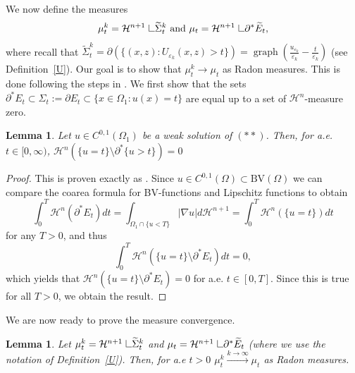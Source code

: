 \documentclass[11pt]{amsart}
\newtheorem{Lemma}[Theorem]{Lemma}
\renewcommand{\epsilon}{\varepsilon}
\DeclareMathOperator{\graph}{graph} \DeclareMathOperator{\closure}{Closure}
\def\e{\epsilon}
\def\H{\mathcal{H}}
\def\wt{\widetilde}
\def\res{\hbox{ {\vrule height .25cm}{\leaders\hrule\hskip.2cm}}\hskip5.0\mu}
\def\BV{\text{BV}}
\begin{document}
 
 
 
 We now  define the measures
 \begin{equation*}\label{measdef}
 \mu_t^k=\H^{n+1}\res \wt \Sigma_t^k \text{  and  }\mu_t=\H^{n+1}\res \partial^*\wt E_t,
 \end{equation*}
 where recall that $\wt \Sigma_t^k=\partial(\{(x, z): U_{\e_k}(x,z)>t\})=\graph \left(\frac{u_{\e_k}}{\e_k}-\frac{t}{\e_k}\right)$ (see Definition~\ref{U}).
 Our goal is to show that $\mu_t^k\to \mu_t$ as Radon measures. This is done following the steps in \cite[Section 5]{S08}. We first show that the sets $\partial^* E_t\subset \Sigma_t:=\partial E_t\subset \{x\in \Omega_1:u(x)=t\}$ are equal up to a set of  $\H^n$-measure zero. 
\begin{Lemma}\label{bdrystar} Let  $u\in C^{0,1}(\Omega_1)$ be a weak solution of $(**)$. Then, for  a.e. $t\in[0,\infty)$, $\H^n(\{u=t\}\setminus\partial^*\{u>t\})=0$
\end{Lemma}
\begin{proof}
This is proven exactly as \cite[Lemma 5.9]{S08}.  Since $u\in C^{0,1}(\Omega)\subset \BV(\Omega)$ we can compare the coarea formula for BV-functions and Lipschitz functions to obtain
\[\int_0^T\H^n(\partial^*E_t)dt=\int_{\Omega_1\cap\{u<T\}}|\nabla u|d\H^{n+1}=\int_0^T\H^n(\{u=t\})dt\]
for any $T>0$, and thus
\[\int_0^T\H^n(\{u=t\}\setminus\partial^* E_t)dt=0,\]
which yields that $\H^n(\{u=t\}\setminus\partial^* E_t)=0$ for a.e. $t\in [0,T]$. Since this is true for all $T>0$, we obtain the result.
\end{proof}

We are now ready to prove the measure convergence.


\begin{Lemma}\label{mainconvergence} Let  $\mu_t^k=\H^{n+1}\res \wt \Sigma_t^k$ and $\mu_t=\H^{n+1}\res \partial^*\wt E_t$ (where we use the notation of Definition~\ref{U}). Then, for a.e  $t>0$  $\mu_t^k\stackrel{k\to\infty}{\longrightarrow}\mu_t$ as Radon measures.
\end{Lemma}
\end{document}
